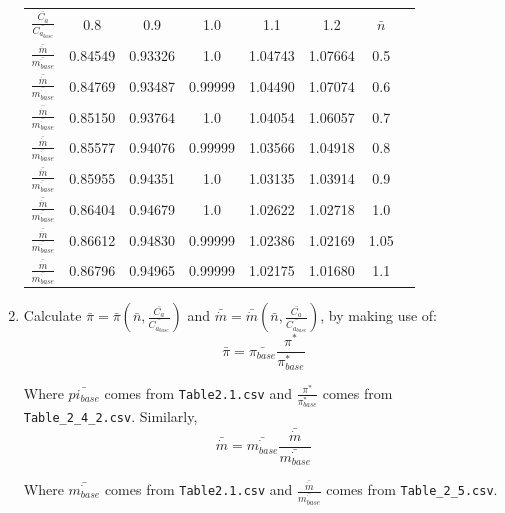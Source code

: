 \documentclass[titlepage]{article}
\begin{document}
\begin{enumerate}
    \begin{center}
        \begin{tabular}{ c c c c c c c c }
            $\frac{\bar{C_{a}}}{\bar{C_{a_{base}}}}$ & 0.8 & 0.9 & 1.0 & 1.1 & 1.2 & $\bar{n}$ \\
            $\frac{\bar{\dot{m}}}{\bar{\dot{m_{base}}}}$ & 0.84549 & 0.93326 & 1.0 & 1.04743 & 1.07664 & 0.5 \\
            $\frac{\bar{\dot{m}}}{\bar{\dot{m_{base}}}}$ & 0.84769 & 0.93487 & 0.99999 & 1.04490 & 1.07074 & 0.6 \\
            $\frac{\bar{\dot{m}}}{\bar{\dot{m_{base}}}}$ & 0.85150 & 0.93764 & 1.0 & 1.04054 & 1.06057 & 0.7 \\
            $\frac{\bar{\dot{m}}}{\bar{\dot{m_{base}}}}$ & 0.85577 & 0.94076 & 0.99999 & 1.03566 & 1.04918 & 0.8 \\
            $\frac{\bar{\dot{m}}}{\bar{\dot{m_{base}}}}$ & 0.85955 & 0.94351 & 1.0 & 1.03135 & 1.03914 & 0.9 \\
            $\frac{\bar{\dot{m}}}{\bar{\dot{m_{base}}}}$ & 0.86404 & 0.94679 & 1.0 & 1.02622 & 1.02718 & 1.0 \\
            $\frac{\bar{\dot{m}}}{\bar{\dot{m_{base}}}}$ & 0.86612 & 0.94830 & 0.99999 & 1.02386 & 1.02169 & 1.05 \\
            $\frac{\bar{\dot{m}}}{\bar{\dot{m_{base}}}}$ & 0.86796 & 0.94965 & 0.99999 & 1.02175 & 1.01680 & 1.1 \\
        \end{tabular}
    \end{center}

    \item Calculate $\bar{\pi} = \bar{\pi} (\bar{n}, \frac{\bar{C_{a}}}{\bar{C_{a_{base}}}})$ and $\bar{\dot{m}} = \bar{\dot{m}} (\bar{n}, \frac{\bar{C_{a}}}{\bar{C_{a_{base}}}})$, by making use of:
    \begin{equation}
        \bar{\pi} = \bar{\pi_{base}} \frac{\pi^{*}}{\pi^{*}_{base}}
    \end{equation}

    Where $\bar{pi_{base}}$ comes from \verb|Table2.1.csv| and $\frac{\pi^{*}}{\pi^{*}_{base}}$ comes from \verb|Table_2_4_2.csv|. Similarly,
    \begin{equation}
        \bar{\dot{m}} = \bar{\dot{m_{base}}} \frac{\bar{\dot{m}}}{\bar{\dot{m_{base}}}}
    \end{equation}

    Where $\bar{\dot{m_{base}}}$ comes from \verb|Table2.1.csv| and $\frac{\bar{\dot{m}}}{\bar{\dot{m_{base}}}}$ comes from \verb|Table_2_5.csv|. 


\end{enumerate}
\end{document}
